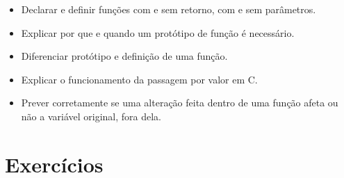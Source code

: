 \begin{objetivos}
\begin{itemize}
    \item Declarar e definir funções com e sem retorno, com e sem parâmetros.
    \item Explicar por que e quando um protótipo de função é necessário.
    \item Diferenciar protótipo e definição de uma função.
    \item Explicar o funcionamento da passagem por valor em C.
    \item Prever corretamente se uma alteração feita dentro de uma função afeta ou não a variável original, fora dela.
\end{itemize}
\end{objetivos}

\section*{Exercícios}

